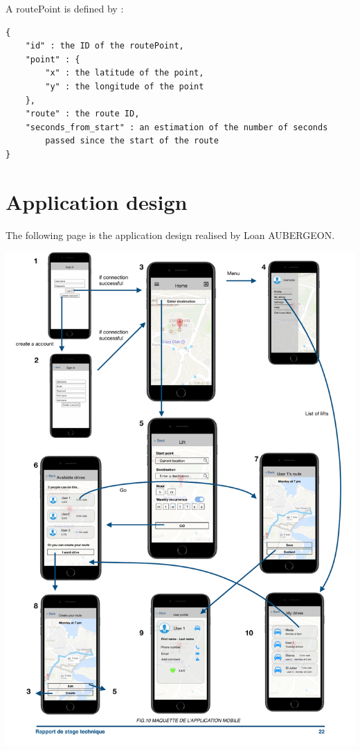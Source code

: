 A routePoint is defined by :
\begin{lstlisting}[style=DOS]
{
	"id" : the ID of the routePoint,
	"point" : {
		"x" : the latitude of the point,
		"y" : the longitude of the point
	},
	"route" : the route ID,
	"seconds_from_start" : an estimation of the number of seconds
		passed since the start of the route
}
\end{lstlisting}


\section{Application design}

The following page is the application design realised by Loan AUBERGEON.
\newpage
\begin{changemargin}{-2.5cm}{-2.5cm}{-3.8cm}
\includegraphics[page=1]{maquettes} 
\end{changemargin}